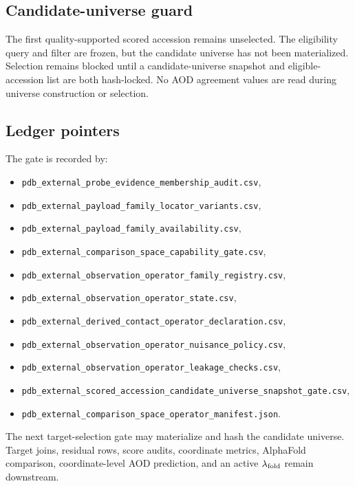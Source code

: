 \subsection{Candidate-universe guard}

The first quality-supported scored accession remains unselected.  The eligibility query and filter are frozen, but the candidate universe has not been materialized.  Selection remains blocked until a candidate-universe snapshot and eligible-accession list are both hash-locked.  No AOD agreement values are read during universe construction or selection.

\subsection{Ledger pointers}

The gate is recorded by:
\begin{itemize}
\item \texttt{pdb\_external\_probe\_evidence\_membership\_audit.csv},
\item \texttt{pdb\_external\_payload\_family\_locator\_variants.csv},
\item \texttt{pdb\_external\_payload\_family\_availability.csv},
\item \texttt{pdb\_external\_comparison\_space\_capability\_gate.csv},
\item \texttt{pdb\_external\_observation\_operator\_family\_registry.csv},
\item \texttt{pdb\_external\_observation\_operator\_state.csv},
\item \texttt{pdb\_external\_derived\_contact\_operator\_declaration.csv},
\item \texttt{pdb\_external\_observation\_operator\_nuisance\_policy.csv},
\item \texttt{pdb\_external\_observation\_operator\_leakage\_checks.csv},
\item \texttt{pdb\_external\_scored\_accession\_candidate\_universe\_snapshot\_gate.csv},
\item \texttt{pdb\_external\_comparison\_space\_operator\_manifest.json}.
\end{itemize}

The next target-selection gate may materialize and hash the candidate universe.  Target joins, residual rows, score audits, coordinate metrics, AlphaFold comparison, coordinate-level AOD prediction, and an active $\lambda_{\rm fold}$ remain downstream.
